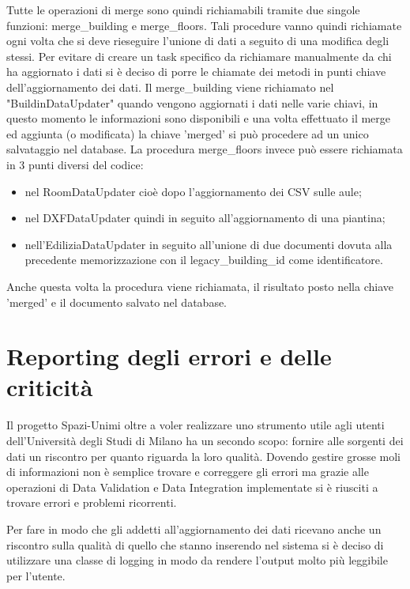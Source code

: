 \documentclass[12pt]{report}
\begin{document}
Tutte le operazioni di merge sono quindi richiamabili tramite due singole funzioni: merge\_building e merge\_floors.
Tali procedure vanno quindi richiamate ogni volta che si deve rieseguire l'unione di dati a seguito di una modifica degli stessi.
Per evitare di creare un task specifico da richiamare manualmente da chi ha aggiornato i dati si è deciso di porre le chiamate dei metodi in punti chiave dell'aggiornamento dei dati.
Il merge\_building viene richiamato nel "BuildinDataUpdater" quando vengono aggiornati i dati nelle varie chiavi, in questo momento le informazioni sono disponibili e una volta effettuato il merge ed aggiunta (o modificata) la chiave 'merged' si può procedere ad un unico salvataggio nel database.
La procedura merge\_floors invece può essere richiamata in 3 punti diversi del codice:
\begin{itemize}
\item nel RoomDataUpdater cioè dopo l'aggiornamento dei CSV sulle aule;
\item nel DXFDataUpdater quindi in seguito all'aggiornamento di una piantina;
\item nell'EdiliziaDataUpdater in seguito all'unione di due documenti dovuta alla precedente memorizzazione con il legacy\_building\_id come identificatore.  
\end{itemize}    

Anche questa volta la procedura viene richiamata, il risultato posto nella chiave 'merged' e il documento salvato nel database.



\newpage
\section{Reporting degli errori e delle criticità}

Il progetto Spazi-Unimi oltre a voler realizzare uno strumento utile agli utenti dell'Università degli Studi di Milano ha un secondo scopo: fornire alle sorgenti dei dati un riscontro per quanto riguarda la loro qualità.
Dovendo gestire grosse moli di informazioni non è semplice trovare e correggere gli errori ma grazie alle operazioni di Data Validation e Data Integration implementate si è riusciti a trovare errori e problemi ricorrenti.

Per fare in modo che gli addetti all'aggiornamento dei dati ricevano anche un riscontro sulla qualità di quello che stanno inserendo nel sistema si è deciso di utilizzare una classe di logging in modo da rendere l'output molto più leggibile per l'utente.
\end{document}
